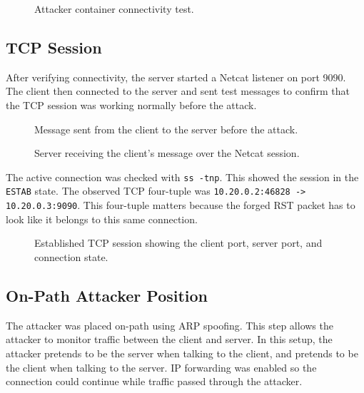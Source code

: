 \begin{figure}[!t]
\centering
{}
\caption{Attacker container connectivity test.}
\label{fig:rst_attacker_ping}
\end{figure}

\subsection{TCP Session}

After verifying connectivity, the server started a Netcat listener on port 9090. The client then connected to the server and sent test messages to confirm that the TCP session was working normally before the attack.

\begin{figure}[!t]
\centering
{}
\caption{Message sent from the client to the server before the attack.}
\label{fig:rst_message1}
\end{figure}

\begin{figure}[!t]
\centering
{}
\caption{Server receiving the client's message over the Netcat session.}
\label{fig:rst_message2}
\end{figure}

The active connection was checked with \texttt{ss -tnp}. This showed the session in the \texttt{ESTAB} state. The observed TCP four-tuple was \texttt{10.20.0.2:46828 -> 10.20.0.3:9090}. This four-tuple matters because the forged RST packet has to look like it belongs to this same connection.

\begin{figure}[!t]
\centering
{}
\caption{Established TCP session showing the client port, server port, and connection state.}
\label{fig:rst_tcp_session}
\end{figure}

\subsection{On-Path Attacker Position}

The attacker was placed on-path using ARP spoofing. This step allows the attacker to monitor traffic between the client and server. In this setup, the attacker pretends to be the server when talking to the client, and pretends to be the client when talking to the server. IP forwarding was enabled so the connection could continue while traffic passed through the attacker.

